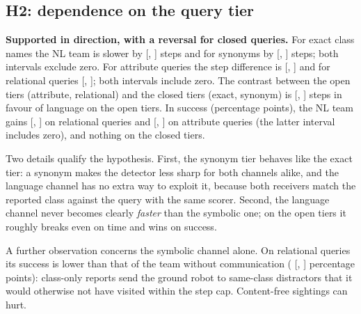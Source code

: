 \subsection{H2: dependence on the query tier}
\textbf{Supported in direction, with a reversal for closed queries.} For exact class names the NL team is slower by  [, ] steps and for synonyms by  [, ] steps; both intervals exclude zero. For attribute queries the step difference is  [, ] and for relational queries  [, ]; both intervals include zero. The contrast between the open tiers (attribute, relational) and the closed tiers (exact, synonym) is  [, ] steps in favour of language on the open tiers. In success (percentage points), the NL team gains  [, ] on relational queries and  [, ] on attribute queries (the latter interval includes zero), and nothing on the closed tiers.

Two details qualify the hypothesis. First, the synonym tier behaves like the exact tier: a synonym makes the detector less sharp for both channels alike, and the language channel has no extra way to exploit it, because both receivers match the reported class against the query with the same scorer. Second, the language channel never becomes clearly \emph{faster} than the symbolic one; on the open tiers it roughly breaks even on time and wins on success.

A further observation concerns the symbolic channel alone. On relational queries its success is lower than that of the team without communication ( [, ] percentage points): class-only reports send the ground robot to same-class distractors that it would otherwise not have visited within the step cap. Content-free sightings can hurt.
